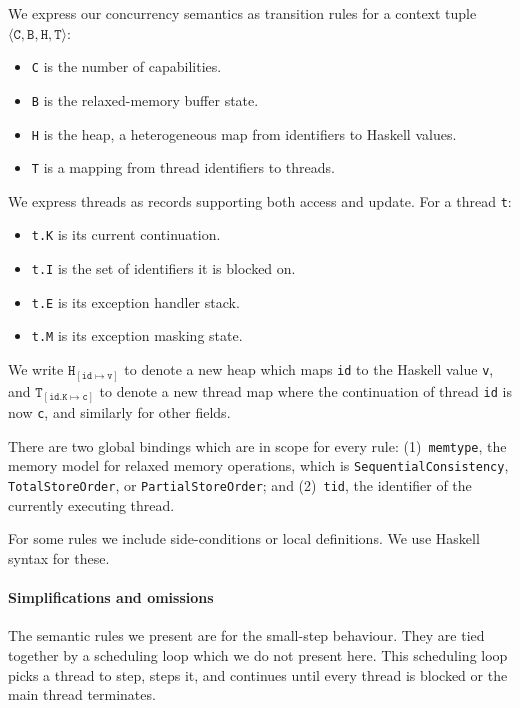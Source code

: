 We express our concurrency semantics as transition rules for a context
tuple $\langle\texttt{C}, \texttt{B}, \texttt{H}, \texttt{T}\rangle$:

\begin{itemize}
\item \verb|C| is the number of capabilities.
\item \verb|B| is the relaxed-memory buffer state.
\item \verb|H| is the heap, a heterogeneous map from identifiers to
  Haskell values.
\item \verb|T| is a mapping from thread identifiers to threads.
\end{itemize}

We express threads as records supporting both access and update.  For
a thread \verb|t|:

\begin{itemize}
\item \verb|t.K| is its current continuation.
\item \verb|t.I| is the set of identifiers it is blocked on.
\item \verb|t.E| is its exception handler stack.
\item \verb|t.M| is its exception masking state.
\end{itemize}

We write $\texttt{H}_{[\texttt{id} \mapsto \texttt{v}]}$ to denote a
new heap which maps \texttt{id} to the Haskell value \texttt{v}, and
$\texttt{T}_{[\texttt{id}.\texttt{K} \mapsto \texttt{c}]}$ to denote a
new thread map where the continuation of thread \texttt{id} is now
\texttt{c}, and similarly for other fields.

There are two global bindings which are in scope for every rule:
(1)~\verb|memtype|, the memory model for relaxed memory operations,
which is \verb|SequentialConsistency|, \verb|TotalStoreOrder|, or
\verb|PartialStoreOrder|; and (2)~\verb|tid|, the identifier of the
currently executing thread.

For some rules we include side-conditions or local definitions.  We
use Haskell syntax for these.

\paragraph{Simplifications and omissions}
The semantic rules we present are for the small-step behaviour.  They
are tied together by a scheduling loop which we do not present here.
This scheduling loop picks a thread to step, steps it, and continues
until every thread is blocked or the main thread terminates.

